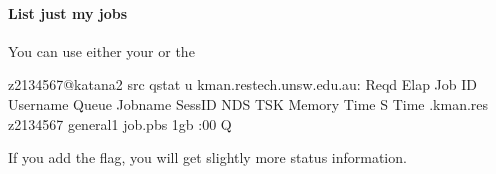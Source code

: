 \documentclass[letterpaper,10pt,english]{sphinxmanual}
\begin{document}
\paragraph{List just my jobs}
\label{\detokenize{using_katana/running_jobs:list-just-my-jobs}}
You can use either your  or the {\hyperref[\detokenize{glossary:term-Environment-Variable}]{}} 

\begin{sphinxVerbatim}[commandchars=\\\{\}]
\PYG{o}{[}z2134567@katana2 src\PYG{o}{]}\PYGZdl{} qstat \PYGZhy{}u 
kman.restech.unsw.edu.au:
                                                            Reqd   Elap
Job ID          Username Queue    Jobname    SessID NDS TSK Memory Time  S Time
\PYGZhy{}\PYGZhy{}\PYGZhy{}\PYGZhy{}\PYGZhy{}\PYGZhy{}\PYGZhy{}\PYGZhy{}\PYGZhy{}\PYGZhy{}\PYGZhy{}\PYGZhy{}\PYGZhy{}\PYGZhy{}\PYGZhy{} \PYGZhy{}\PYGZhy{}\PYGZhy{}\PYGZhy{}\PYGZhy{}\PYGZhy{}\PYGZhy{}\PYGZhy{} \PYGZhy{}\PYGZhy{}\PYGZhy{}\PYGZhy{}\PYGZhy{}\PYGZhy{}\PYGZhy{}\PYGZhy{} \PYGZhy{}\PYGZhy{}\PYGZhy{}\PYGZhy{}\PYGZhy{}\PYGZhy{}\PYGZhy{}\PYGZhy{}\PYGZhy{}\PYGZhy{} \PYGZhy{}\PYGZhy{}\PYGZhy{}\PYGZhy{}\PYGZhy{}\PYGZhy{} \PYGZhy{}\PYGZhy{}\PYGZhy{} \PYGZhy{}\PYGZhy{}\PYGZhy{} \PYGZhy{}\PYGZhy{}\PYGZhy{}\PYGZhy{}\PYGZhy{}\PYGZhy{} \PYGZhy{}\PYGZhy{}\PYGZhy{}\PYGZhy{}\PYGZhy{} \PYGZhy{} \PYGZhy{}\PYGZhy{}\PYGZhy{}\PYGZhy{}\PYGZhy{}
.kman.res z2134567 general1 job.pbs       \PYGZhy{}\PYGZhy{}           1gb :00 Q   \PYGZhy{}\PYGZhy{}
\end{sphinxVerbatim}

If you add the  flag, you will get slightly more status information.
\end{document}
